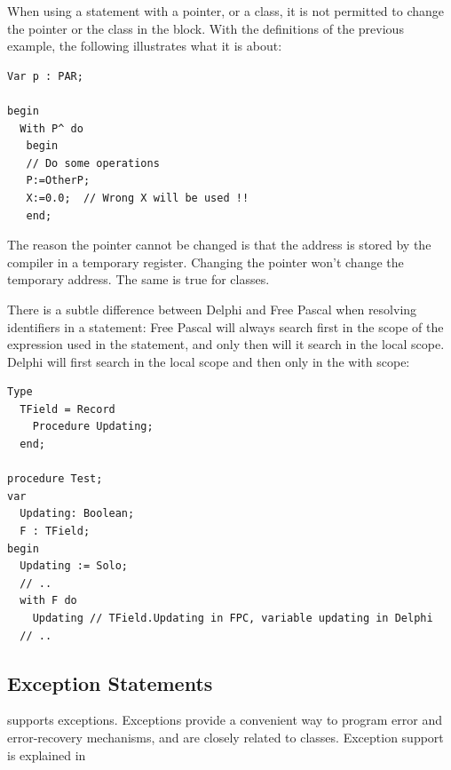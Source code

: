 \begin{remark}
When using a  statement with a pointer, or a class, it is not
permitted to change the pointer or the class in the  block.
With the definitions of the previous example, the following illustrates
what it is about:
\begin{verbatim}
Var p : PAR;

begin
  With P^ do
   begin
   // Do some operations
   P:=OtherP;
   X:=0.0;  // Wrong X will be used !!
   end;
\end{verbatim}
The reason the pointer cannot be changed is that the address is stored
by the compiler in a temporary register. Changing the pointer won't change
the temporary address. The same is true for classes.
\end{remark}
\begin{remark}
There is a subtle difference between Delphi and Free Pascal when resolving identifiers in a   statement:
Free Pascal will always search first in the scope of the expression used in the  statement, 
and only then will it search in the local scope. Delphi will first search in the local scope and then only in the with scope:
\begin{verbatim}
Type
  TField = Record
    Procedure Updating;
  end;

procedure Test;
var
  Updating: Boolean;
  F : TField;
begin
  Updating := Solo;
  // ..
  with F do 
    Updating // TField.Updating in FPC, variable updating in Delphi
  // ..
\end{verbatim}  
\end{remark}

\subsection{Exception Statements}
\fpc supports exceptions. Exceptions provide a convenient way to
program error and error-recovery mechanisms, and are
closely related to classes.
Exception support is explained in 

